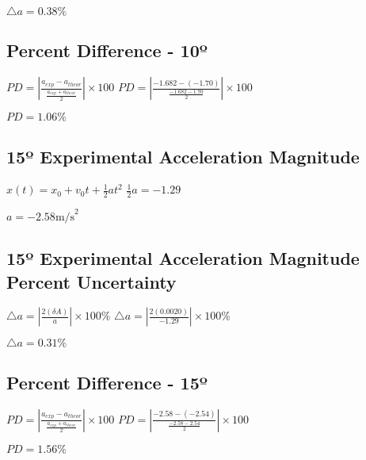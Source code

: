 \documentclass{article}
\begin{document}
$\triangle a = 0.38 \%$

\subsection{Percent Difference - 10º}
$PD = \left| \frac {a_{exp}-a_{theor}}{\frac {a_{exp}+a_{theor}}{2}}\right| \times 100$
\newline
\newline
$PD = \left| \frac {-1.682-(-1.70)}{\frac {-1.682-1.70}{2}}\right| \times 100$
\newline
\newline



$PD =1.06 \%$
\subsection{15º Experimental Acceleration Magnitude}
$x(t)= x_0 + v_0t + \frac{1}{2}at^2$
\newline
$\frac {1}{2}a = -1.29$
\newline



$a=-2.58 \text {m/s}^2$
\newline 

\subsection{15º Experimental Acceleration Magnitude Percent Uncertainty}
$\triangle a = |\frac {2(\delta A)}{a}| \times 100 \%$
\newline
$\triangle a = |\frac {2(0.0020)}{-1.29}| \times 100 \%$
\newline



$\triangle a = 0.31 \%$

\subsection{Percent Difference - 15º}
$PD = \left| \frac {a_{exp}-a_{theor}}{\frac {a_{exp}+a_{theor}}{2}}\right| \times 100$
\newline
\newline
$PD = \left| \frac {-2.58-(-2.54)}{\frac {-2.58-2.54}{2}}\right| \times 100$
\newline
\newline



$PD =1.56 \%$
\end{document}

